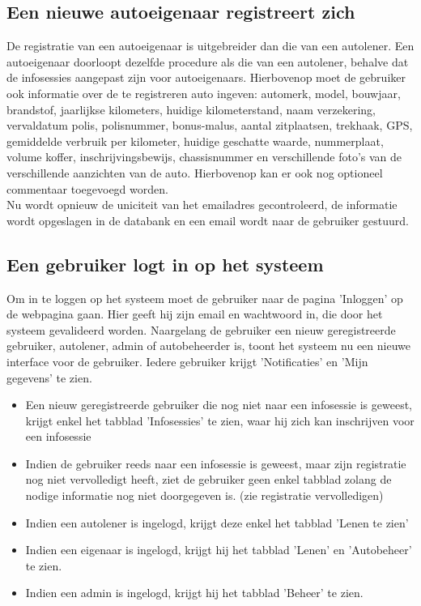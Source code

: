 \documentclass[11pt,a4paper,oneside]{article}
\begin{document}
\subsection{Een nieuwe autoeigenaar registreert zich}
De registratie van een autoeigenaar is uitgebreider dan die van een autolener. Een autoeigenaar doorloopt dezelfde procedure als die van een autolener, behalve dat de infosessies aangepast zijn voor autoeigenaars. Hierbovenop moet de gebruiker ook informatie over de te registreren auto ingeven: automerk, model, bouwjaar, brandstof, jaarlijkse kilometers, huidige kilometerstand, naam verzekering, vervaldatum polis, polisnummer, bonus-malus, aantal zitplaatsen, trekhaak, GPS, gemiddelde verbruik per kilometer, huidige geschatte waarde, nummerplaat, volume koffer, inschrijvingsbewijs, chassisnummer en verschillende foto's van de verschillende aanzichten van de auto. Hierbovenop kan er ook nog optioneel commentaar toegevoegd worden. \\
Nu wordt opnieuw de uniciteit van het emailadres gecontroleerd, de informatie wordt opgeslagen in de databank en een email wordt naar de gebruiker gestuurd.

\subsection{Een gebruiker logt in op het systeem}
Om in te loggen op het systeem moet de gebruiker naar de pagina 'Inloggen' op de webpagina gaan. Hier geeft hij zijn email en wachtwoord in, die door het systeem gevalideerd worden. Naargelang de gebruiker een nieuw geregistreerde gebruiker, autolener, admin of autobeheerder is, toont het systeem nu een nieuwe interface voor de gebruiker. Iedere gebruiker krijgt 'Notificaties' en 'Mijn gegevens' te zien. 
\begin{itemize}
	\item	Een nieuw geregistreerde gebruiker die nog niet naar een infosessie is geweest, krijgt enkel het tabblad 'Infosessies' te zien, waar hij zich kan inschrijven voor een infosessie
	\item	Indien de gebruiker reeds naar een infosessie is geweest, maar zijn registratie nog niet vervolledigt heeft, ziet de gebruiker geen enkel tabblad zolang de nodige informatie nog niet doorgegeven is. (zie registratie vervolledigen)
	\item	Indien een autolener is ingelogd, krijgt deze enkel het tabblad 'Lenen te zien'
	\item	Indien een eigenaar is ingelogd, krijgt hij het tabblad 'Lenen' en 'Autobeheer' te zien.
	\item	Indien een admin is ingelogd, krijgt hij het tabblad 'Beheer' te zien.
\end{itemize}
\end{document}
